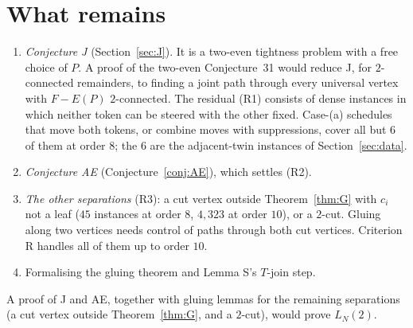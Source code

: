 \documentclass[11pt]{amsart}
\theoremstyle{definition}
\begin{document}
\section{What remains}\label{sec:open}
\begin{enumerate}
\item \emph{Conjecture J} (Section~\ref{sec:J}). It is a two-even tightness problem with a free choice
of $P$. A proof of the two-even Conjecture~31 would reduce J, for $2$-connected remainders, to finding a joint path
through every universal vertex with $F-E(P)$ $2$-connected. The residual (R1) consists of dense
instances in which neither token can be steered with the other fixed. Case-(a) schedules that move
both tokens, or combine moves with suppressions, cover all but $6$ of them at order $8$; the $6$ are
the adjacent-twin instances of Section~\ref{sec:data}.
\item \emph{Conjecture AE} (Conjecture~\ref{conj:AE}), which settles (R2).
\item \emph{The other separations} (R3): a cut vertex outside Theorem~\ref{thm:G} with $c_i$ not a leaf
($45$ instances at order $8$, $4{,}323$ at order $10$), or a $2$-cut. Gluing along two vertices needs
control of paths through both cut vertices. Criterion R handles all of them up to order $10$.
\item Formalising the gluing theorem and Lemma S's $T$-join step.
\end{enumerate}
A proof of J and AE, together with gluing lemmas for the remaining separations (a cut vertex outside
Theorem~\ref{thm:G}, and a $2$-cut), would prove $L_N(2)$.
\end{document}
